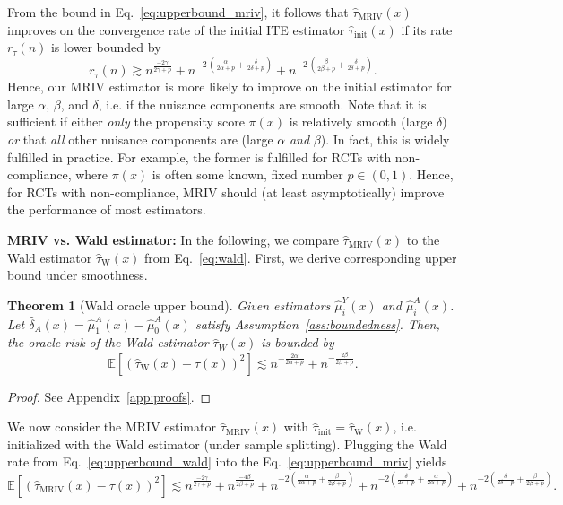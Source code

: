\documentclass[nonatbib]{article}
\newcommand{\E}{\mathbb{E}}
\newcommand{\frameworkname}{MRIV\xspace}
\theoremstyle{definition}
\theoremstyle{plain}
\newtheorem{theorem}{Theorem}
\begin{document}
From the bound in Eq.~\eqref{eq:upperbound_mriv}, it follows that $\hat{\tau}_{\mathrm{MRIV}}(x)$ improves on the convergence rate of the initial ITE estimator $\hat{\tau}_{\mathrm{init}}(x)$ if its rate $r_{\tau}(n)$ is lower bounded by
\begin{equation}\label{eq:lowerbound_mriv}
    r_{\tau}(n) \gtrsim n^{\frac{-2\gamma}{2\gamma+p}} + n^{-2 \, \left(\frac{\alpha}{2\alpha+p}+\frac{\delta}{2\delta+p}\right)} +
    n^{-2\, \left(\frac{\beta}{2\beta+p}+\frac{\delta}{2\delta+p}\right)}.
\end{equation}
Hence, our \frameworkname estimator is more likely to improve on the initial estimator for large $\alpha$, $\beta$, and $\delta$, i.e. if the nuisance components are smooth. Note that it is sufficient if either \emph{only} the propensity score $\pi(x)$ is relatively smooth (large $\delta$) \emph{or} that \emph{all} other nuisance components are (large $\alpha$ \emph{and} $\beta$). In fact, this is widely fulfilled in practice. For example, the former is fulfilled for RCTs with non-compliance, where $\pi(x)$ is often some known, fixed number $p \in (0,1)$. Hence, for RCTs with non-compliance, \frameworkname should (at least asymptotically) improve the performance of most estimators. 

\textbf{\frameworkname vs. Wald estimator:} In the following, we compare $\hat{\tau}_{\mathrm{MRIV}}(x)$ to the Wald estimator $\hat{\tau}_{\mathrm{W}}(x)$ from Eq.~\eqref{eq:wald}. First, we derive corresponding upper bound under smoothness.

\begin{theorem}[Wald oracle upper bound]\label{thrm:rate_wald}
Given estimators $\hat{\mu}_i^Y(x)$ and $\hat{\mu}_i^A(x)$. Let $\hat{\delta}_A(x) = \hat{\mu}_1^A(x) - \hat{\mu}_0^A(x)$ satisfy Assumption~\ref{ass:boundedness}. Then, the oracle risk of the Wald estimator $\hat{\tau}_W(x)$ is bounded by
\begin{equation}\label{eq:upperbound_wald}
    \E\left[(\hat{\tau}_{\mathrm{W}}(x) - \tau(x))^2\right] \lesssim  n^{-\frac{2\alpha}{2\alpha+p}} + n^{-\frac{2\beta}{2\beta+p}}.
\end{equation}
\end{theorem}
\begin{proof}
See Appendix~\ref*{app:proofs}.
\end{proof}

We now consider the \frameworkname estimator $\hat{\tau}_{\mathrm{MRIV}}(x)$ with $\hat{\tau}_{\mathrm{init}} = \hat{\tau}_{\mathrm{W}}(x)$, i.e. initialized with the Wald estimator (under sample splitting). Plugging the Wald rate from Eq.~\eqref{eq:upperbound_wald} into the Eq.~\eqref{eq:upperbound_mriv} yields
\begin{equation}
    \E\left[\left(\hat{\tau}_{\mathrm{MRIV}}(x) - \tau(x)\right)^2\right] \lesssim n^{\frac{-2\gamma}{2\gamma+p}} +
    n^{\frac{-4\beta}{2\beta+p}} +
    n^{-2\left(\frac{\alpha}{2\alpha+p}+\frac{\beta}{2\beta+p}\right)} + n^{-2\left(\frac{\delta}{2\delta+p}+\frac{\alpha}{2\alpha+p}\right)} +
    n^{-2\left(\frac{\delta}{2\delta+p}+\frac{\beta}{2\beta+p}\right)}.
\end{equation}
\end{document}

